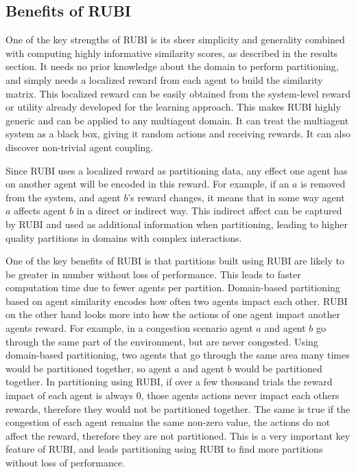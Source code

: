 \documentclass[letterpaper]{article}
\begin{document}
\subsection{Benefits of RUBI}
One of the key strengths of RUBI is its sheer simplicity and generality combined with computing highly informative similarity scores, as described in the results section. It needs no prior knowledge about the domain to perform partitioning, and simply needs a localized reward from each agent to build the similarity matrix. This localized reward can be easily obtained from the system-level reward or utility already developed for the learning approach. This makes RUBI highly generic and can be applied to any multiagent domain. It can treat the multiagent system as a black box, giving it random actions and receiving rewards. It can also discover non-trivial agent coupling. 

Since RUBI uses a localized reward as partitioning data, any effect one agent has on another agent will be encoded in this reward. For example, if an $a$ is removed from the system, and agent $b$'s reward changes, it means that in some way agent $a$ affects agent $b$ in a direct or indirect way. This indirect affect can be captured by RUBI and used as additional information when partitioning, leading to higher quality partitions in domains with complex interactions.

One of the key benefits of RUBI is that partitions built using RUBI are likely to be greater in number without loss of performance. This leads to faster computation time due to fewer agents per partition. Domain-based partitioning based on agent similarity encodes how often two agents impact each other. RUBI on the other hand looks more into how the actions of one agent impact another agents reward. For example, in a congestion scenario agent $a$ and agent $b$ go through the same part of the environment, but are never congested. Using domain-based partitioning, two agents that go through the same area many times would be partitioned together, so agent $a$ and agent $b$ would be partitioned together. In partitioning using RUBI, if over a few thousand trials the reward impact of each agent is always 0, those agents actions never impact each others rewards, therefore they would not be partitioned together. The same is true if the congestion of each agent remains the same non-zero value, the actions do not affect the reward, therefore they are not partitioned. This is a very important key feature of RUBI, and leads partitioning using RUBI to find more partitions without loss of performance.
\end{document}

